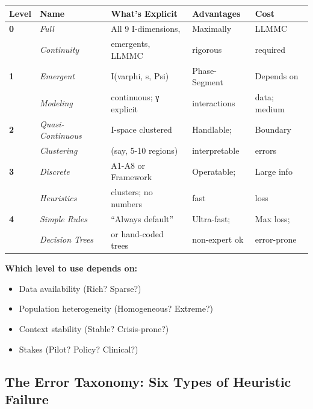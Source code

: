 \begin{definition}
\label{def:20-levels}

\begin{center}
\renewcommand{\arraystretch}{1.5}
\small
\begin{tabular}{@{}llp{6cm}ll@{}}
\toprule
\textbf{Level} & \textbf{Name} & \textbf{What's Explicit} & \textbf{Advantages} & \textbf{Cost} \\
\midrule
\textbf{0} & \textit{Full} & All 9 I-dimensions, & Maximally & LLMMC \\
 & \textit{Continuity} & emergents, LLMMC & rigorous & required \\
\midrule
\textbf{1} & \textit{Emergent} & I(varphi, s, Psi) & Phase-Segment & Depends on \\
 & \textit{Modeling} & continuous; γ explicit & interactions & data; medium \\
\midrule
\textbf{2} & \textit{Quasi-Continuous} & I-space clustered & Handlable; & Boundary \\
 & \textit{Clustering} & (say, 5-10 regions) & interpretable & errors \\
\midrule
\textbf{3} & \textit{Discrete} & A1-A8 or Framework & Operatable; & Large info \\
 & \textit{Heuristics} & clusters; no numbers & fast & loss \\
\midrule
\textbf{4} & \textit{Simple Rules} & ``Always default'' & Ultra-fast; & Max loss; \\
 & \textit{Decision Trees} & or hand-coded trees & non-expert ok & error-prone \\
\bottomrule
\end{tabular}
\end{center}

\textbf{Which level to use depends on:}
\begin{itemize}[nosep]
\item Data availability (Rich? Sparse?)
\item Population heterogeneity (Homogeneous? Extreme?)
\item Context stability (Stable? Crisis-prone?)
\item Stakes (Pilot? Policy? Clinical?)
\end{itemize}

\end{definition}

\subsection{The Error Taxonomy: Six Types of Heuristic Failure}
\label{subsec:20-error-taxonomy}

